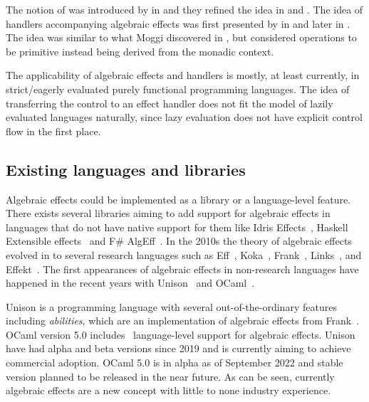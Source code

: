The notion of  was introduced by \textcite{adequacy-for-alg-effs} in \citeyear{adequacy-for-alg-effs} and they refined the idea in \cite{comp-effs-and-ops} and \cite{alg-ops-gen-effs}. The idea of handlers accompanying algebraic effects was first presented by \textcite{handlers-of-alg-effs} in \citeyear{handlers-of-alg-effs} and later \textcite{handling-alg-effs} in \citeyear{handling-alg-effs}. The idea was similar to what Moggi discovered in \cite{notions-computations}, but \citeauthor{adequacy-for-alg-effs} considered operations to be primitive instead being derived from the monadic context.

The applicability of algebraic effects and handlers is mostly, at least currently, in strict/eagerly evaluated purely functional programming languages. The idea of transferring the control to an effect handler does not fit the model of lazily evaluated languages naturally, since lazy evaluation does not have explicit control flow in the first place.~\cite{alg-effs-for-fp}



\subsection{Existing languages and libraries}
Algebraic effects could be implemented as a library or a language-level feature. There exists several libraries aiming to add support for algebraic effects in languages that do not have native support for them like Idris Effects~\cite{idris-effects}, Haskell Extensible effects~\cite{extensible-effects} and F\# AlgEff~\cite{fsharp-alg-eff}. In the 2010s the theory of algebraic effects evolved in to several research languages such as Eff~\cite{eff-lang}, Koka~\cite{koka-lang}, Frank~\cite{frank-lang}, Links~\cite{links-lang}, and Effekt~\cite{effekt-lang}. The first appearances of algebraic effects in non-research languages have happened in the recent years with Unison~\cite{unison-lang} and OCaml~\cite{ocaml-lang}.

Unison is a programming language with several out-of-the-ordinary features including \textit{abilities}, which are an implementation of algebraic effects from Frank~\cite{frank-lang}. OCaml version 5.0 includes~\cite{ocaml-mc-sep-2021} language-level support for algebraic effects. Unison have had alpha and beta versions since 2019 and is currently aiming to achieve commercial adoption. OCaml 5.0 is in alpha as of September 2022 and stable version planned to be released in the near future. As can be seen, currently algebraic effects are a new concept with little to none industry experience.



